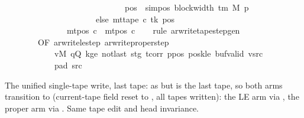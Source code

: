 \begin{isabellebody}
\ \ \ \ \ \ \ \ \ \ \ \ \ \ \ \ \ \ \ \ \ \ \ \ \ \ \ \ \ {\isacharparenleft}{\kern0pt}pos\ {\isacharminus}{\kern0pt}\ sim{\isacharunderscore}{\kern0pt}pos\ {\isacharparenleft}{\kern0pt}block{\isacharunderscore}{\kern0pt}width\ {\isacharparenleft}{\kern0pt}{\isasymGamma}{\isacharunderscore}{\kern0pt}tm\ M{\isacharparenright}{\kern0pt}{\isacharparenright}{\kern0pt}\ p{\isacharparenright}{\kern0pt}\isanewline
\ \ \ \ \ \ \ \ \ \ \ \ \ \ \ \ \ \ \ \ \ \ else\ mt{\isacharunderscore}{\kern0pt}tape\ c{\isacharprime}{\kern0pt}\ tk\ pos{\isacharparenright}{\kern0pt}{\isacharparenright}{\kern0pt}{\isacharparenright}{\kern0pt}\isanewline
\ \ \ \ \ \ \ \ \ \ \ \ \ \ {\isasymand}\ mt{\isacharunderscore}{\kern0pt}pos\ c{\isacharprime}{\kern0pt}{\isacharprime}{\kern0pt}\ {\isacharequal}{\kern0pt}\ mt{\isacharunderscore}{\kern0pt}pos\ c{\isacharprime}{\kern0pt}{\isachardoublequoteclose}\isanewline
%
\isadelimproof
\ \ %
\endisadelimproof
%
\isatagproof
{}\isamarkupfalse%
\ {\isacharparenleft}{\kern0pt}rule\ ar{\isacharunderscore}{\kern0pt}write{\isacharunderscore}{\kern0pt}tape{\isacharunderscore}{\kern0pt}step{\isacharunderscore}{\kern0pt}gen\isanewline
\ \ \ \ \ \ \ \ {\isacharbrackleft}{\kern0pt}OF\ ar{\isacharunderscore}{\kern0pt}write{\isacharunderscore}{\kern0pt}le{\isacharunderscore}{\kern0pt}step\ ar{\isacharunderscore}{\kern0pt}write{\isacharunderscore}{\kern0pt}proper{\isacharunderscore}{\kern0pt}step\isanewline
\ \ \ \ \ \ \ \ \ \ \ \ vM\ qQ\ kge{}\ notlast\ stg\ tcorr\ ppos\ poskle\ buf{\isacharunderscore}{\kern0pt}valid\ vsrc\isanewline
\ \ \ \ \ \ \ \ \ \ \ \ pad{}\ src{}{\isacharbrackright}{\kern0pt}{\isacharparenright}{\kern0pt}%
\endisatagproof
{\isafoldproof}%
%
\isadelimproof
%
\endisadelimproof
%
\begin{isamarkuptext}%
The unified single-tape write, last tape: as
   but  is the last tape, so both
  arms transition to  (current-tape field reset to
  , all tapes written): the LE arm via
  , the proper arm via
  .  Same tape edit and head
  invariance.%

\end{isamarkuptext}
\end{isabellebody}
